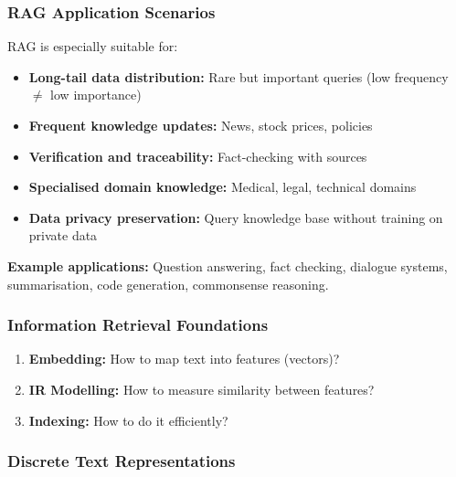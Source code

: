 \bigseparator

\subsubsection{RAG Application Scenarios}

\begin{defbox}
RAG is especially suitable for:
\begin{itemize}
  \item \textbf{Long-tail data distribution:} Rare but important queries (low frequency $\neq$ low importance)
  \item \textbf{Frequent knowledge updates:} News, stock prices, policies
  \item \textbf{Verification and traceability:} Fact-checking with sources
  \item \textbf{Specialised domain knowledge:} Medical, legal, technical domains
  \item \textbf{Data privacy preservation:} Query knowledge base without training on private data
\end{itemize}
\end{defbox}

\textbf{Example applications:} Question answering, fact checking, dialogue systems, summarisation, code generation, commonsense reasoning.

\bigseparator

\subsubsection{Information Retrieval Foundations}

\begin{defbox}
\begin{enumerate}
  \item \textbf{Embedding:} How to map text into features (vectors)?
  \item \textbf{IR Modelling:} How to measure similarity between features?
  \item \textbf{Indexing:} How to do it efficiently?
\end{enumerate}
\end{defbox}

\bigseparator

\subsubsection{Discrete Text Representations}

